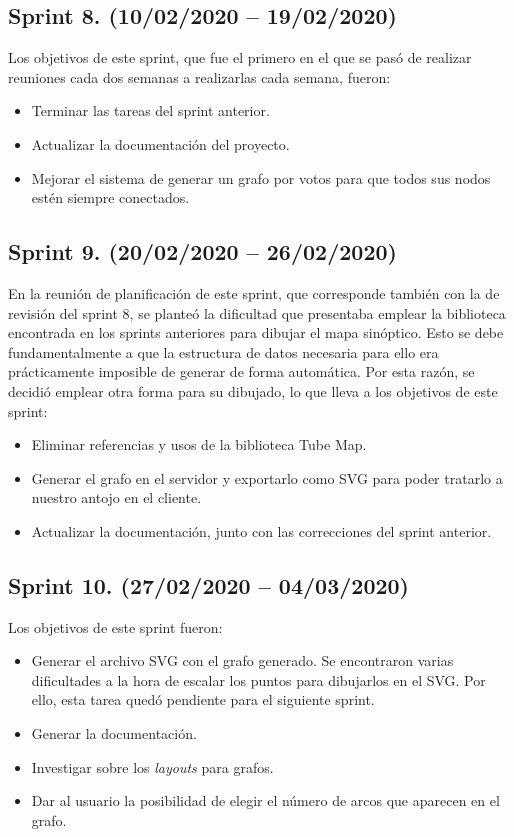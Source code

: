 \subsection{Sprint 8. (10/02/2020 -- 19/02/2020)}
Los objetivos de este sprint, que fue el primero en el que se pasó de realizar reuniones cada dos semanas a realizarlas cada semana, fueron:
\begin{itemize}
	\item Terminar las tareas del sprint anterior.
	\item Actualizar la documentación del proyecto.
	\item Mejorar el sistema de generar un grafo por votos para que todos sus nodos estén siempre conectados.
\end{itemize}

\subsection{Sprint 9. (20/02/2020 -- 26/02/2020)}
En la reunión de planificación de este sprint, que corresponde también con la de revisión del sprint 8, se planteó la dificultad que presentaba emplear la biblioteca encontrada en los sprints anteriores para dibujar el mapa sinóptico. Esto se debe fundamentalmente a que la estructura de datos necesaria para ello era prácticamente imposible de generar de forma automática.
Por esta razón, se decidió emplear otra forma para su dibujado, lo que lleva a los objetivos de este sprint:
\begin{itemize}
	\item Eliminar referencias y usos de la biblioteca Tube Map.
	\item Generar el grafo en el servidor y exportarlo como SVG para poder tratarlo a nuestro antojo en el cliente.
	\item Actualizar la documentación, junto con las correcciones del sprint anterior.
\end{itemize}

\subsection{Sprint 10. (27/02/2020 -- 04/03/2020)}
Los objetivos de este sprint fueron:
\begin{itemize}
	\item Generar el archivo SVG con el grafo generado. Se encontraron varias dificultades a la hora de escalar los puntos para dibujarlos en el SVG. Por ello, esta tarea quedó pendiente para el siguiente sprint.
	\item Generar la documentación.
	\item Investigar sobre los \textit{layouts} para grafos.
	\item Dar al usuario la posibilidad de elegir el número de arcos que aparecen en el grafo.
\end{itemize}

